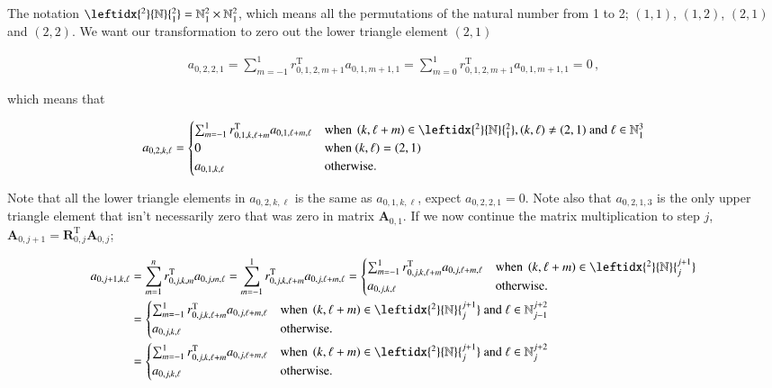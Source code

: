 \documentclass[11pt,english,a4paper]{article}
\begin{document}
\begin{flushleft}
The notation $\leftidx{^2}{\mathbb{N}}{_1^2} = \mathbb{N}_1^2 \times \mathbb{N}_1^2$, which means all the permutations of the natural number from 1 to 2; $(1,1)$, $(1,2)$, $(2,1)$ and $(2,2)$. We want our transformation to zero out the lower triangle element $(2,1)$

\begin{align*}
a_{0,2,2,1} = \sum_{m=-1}^1 r_{0,1,2,m+1}^{\text{T}} a_{0,1,m+1,1} = \sum_{m=0}^1 r_{0,1,2,m+1}^{\text{T}} a_{0,1,m+1,1} = 0\,,
\end{align*}

which means that 

\begin{align*}
a_{0,2,k,\ell} = \begin{cases} \sum_{m=-1}^1 r_{0,1,k,\ell+m}^{\text{T}} a_{0,1,\ell+m,\ell} & \text{when } \p{k,\ell+m}\in{\leftidx{^2}{\mathbb{N}}{_1^2}}, (k,\ell)\neq(2,1) \text{ and } \ell \in\mathbb{N}_1^3\\ 0 & \text{when } (k,\ell)=(2,1) \\ a_{0,1,k,\ell} & \text{otherwise.}\end{cases}
\end{align*}

Note that all the lower triangle elements in $a_{0,2,k,\ell}$ is the same as $a_{0,1,k,\ell}$, expect $a_{0,2,2,1} = 0$. Note also that $a_{0,2,1,3}$ is the only upper triangle element that isn't necessarily zero that was zero in matrix $\textbf{A}_{0,1}$. If we now continue the matrix multiplication to step $j$, $\textbf{A}_{0,j+1} = \textbf{R}_{0,j}^{\text{T}} \textbf{A}_{0,j}$;

\begin{align*}
a_{0,j+1,k,\ell} &= \sum_{m=1}^n r_{0,j,k,m}^{\text{T}} a_{0,j,m,\ell} = \sum_{m=-1}^1 r_{0,j,k,\ell+m}^{\text{T}} a_{0,j,\ell+m,\ell} 
= \begin{cases} \sum_{m=-1}^1 r_{0,j,k,\ell+m}^{\text{T}} a_{0,j,\ell+m,\ell} & \text{when } \p{k,\ell+m}\in{\leftidx{^2}{\mathbb{N}}{_j^{j+1}}}\\ a_{0,j,k,\ell} & \text{otherwise.}\end{cases}
\\
&= \begin{cases} \sum_{m=-1}^1 r_{0,j,k,\ell+m}^{\text{T}} a_{0,j,\ell+m,\ell} & \text{when } \p{k,\ell+m}\in{\leftidx{^2}{\mathbb{N}}{_j^{j+1}}} \text{ and } \ell \in\mathbb{N}_{j-1}^{j+2}\\ a_{0,j,k,\ell} & \text{otherwise.}\end{cases}
\\
&= \begin{cases} \sum_{m=-1}^1 r_{0,j,k,\ell+m}^{\text{T}} a_{0,j,\ell+m,\ell} & \text{when } \p{k,\ell+m}\in{\leftidx{^2}{\mathbb{N}}{_j^{j+1}}} \text{ and } \ell \in\mathbb{N}_{j}^{j+2}\\ a_{0,j,k,\ell} & \text{otherwise.}\end{cases}
\end{align*}


\end{flushleft}
\end{document}
